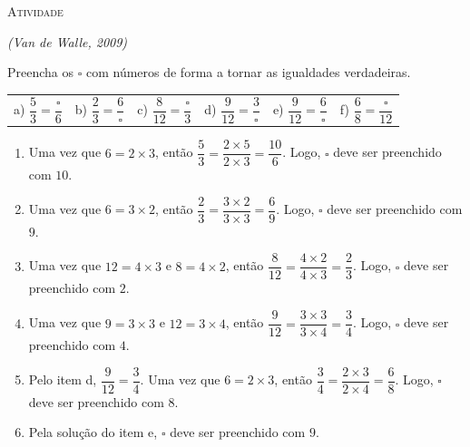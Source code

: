 \documentclass[10 pt,usenames,dvipsnames, oneside]{article}
\begin{document}
\bigskip
\begin{center}
{\large \scshape Atividade}
\end{center}
\fi

\textit{(Van de Walle, 2009)}

Preencha os $\square$ com números de forma a tornar as igualdades verdadeiras.

\noindent\begin{tabular}{m{}m{}m{}m{}m{}m{}}
a)  $\dfrac{5}{3} = \dfrac{\square}{6}$ & b) $\dfrac{2}{3} = \dfrac{6}{\square}$ & c) $\dfrac{8}{12} = \dfrac{\square}{3}$ & d) $\dfrac{9}{12} = \dfrac{3}{\square}$& e) $\dfrac{9}{12} = \dfrac{6}{\square}$& f)  $\dfrac{6}{8} = \dfrac{\square}{12}$
\end{tabular}

\ifdefined\prof
\begin{solucao}

\begin{enumerate}
\item Uma vez que       $6 = 2 \times 3$, então       $\dfrac{5}{3} =
\dfrac{2 \times 5}{2 \times 3} = \dfrac{10}{6}$. Logo,       $\square$       deve
ser preenchido com       $10$.
\item       Uma vez que       $6 = 3 \times 2$, então       $\dfrac{2}{3} =
\dfrac{3 \times 2}{3 \times 3} = \dfrac{6}{9}$. Logo,       $\square$       deve
ser preenchido com       $9$.
\item       Uma vez que       $12 = 4 \times 3$       e       $8 = 4 \times
2$, então       $\dfrac{8}{12} = \dfrac{4 \times 2}{4 \times 3} = \dfrac{2}{3}$.
Logo,       $\square$       deve ser preenchido com       $2$.
\item       Uma vez que       $9 = 3 \times 3$       e       $12 = 3 \times
4$, então       $\dfrac{9}{12} = \dfrac{3 \times 3}{3 \times 4} = \dfrac{3}{4}$.
Logo,       $\square$       deve ser preenchido com       $4$.
\item       Pelo item d,       $\dfrac{9}{12} = \dfrac{3}{4}$. Uma vez que
$6 = 2 \times 3$, então       $\dfrac{3}{4} = \dfrac{2 \times 3}{2 \times 4} =
\dfrac{6}{8}$. Logo,       $\square$       deve ser preenchido com       $8$.
\item       Pela solução do item e,       $\square$       deve ser
preenchido com       $9$.
\end{enumerate}

\end{solucao}
\fi
\end{document}
